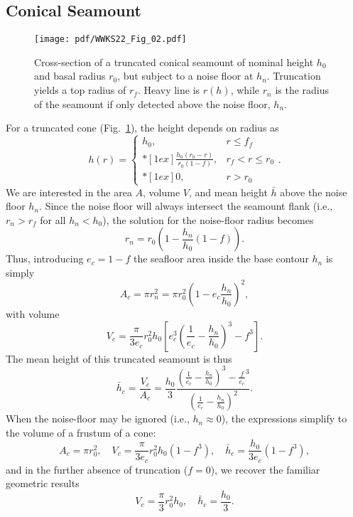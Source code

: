 \subsection{Conical Seamount}

\begin{figure}
\centering
\texttt{[image: pdf/WWKS22\_Fig\_02.pdf]}
\caption{Cross-section of a truncated conical seamount of nominal height $h_0$ and basal radius $r_0$, but subject
to a noise floor at $h_n$.  Truncation yields a top radius of $r_f$. Heavy line is $r(h)$, while $r_n$ is the
radius of the seamount if only detected above the noise floor, $h_n$.}
\label{WWKS22_Fig_02}
\end{figure}
For a truncated cone (Fig.~\ref{WWKS22_Fig_02}), the height depends on radius as
\begin{equation*}
h(r) = \left \{ \begin{array}{cl}
	h_0, &	r \leq f_f \\*[1ex]
	\displaystyle \frac{h_0 (r_0 - r)}{r_0 (1-f)}, & r_f < r \leq r_0 \\*[1ex]
	0, & r > r_0
\end{array} \right..
\end{equation*}
We are interested in the area $A$, volume $V$, and mean height $\bar{h}$ above the noise floor $h_n$.
Since the noise floor will always intersect the seamount flank (i.e., $r_n > r_f$ for all $h_n < h_0$),
the solution for the noise-floor radius becomes
\begin{equation*}
r_n = r_0 \left ( 1 - \frac{h_n}{h_0}(1 - f) \right ).
\end{equation*}
Thus, introducing $e_c = 1 -f$ the seafloor area inside the base contour $h_n$ is simply
\begin{equation}
A_c = \pi r_n^2 = \pi r_0^2 \left ( 1 - e_c\frac{h_n}{h_0} \right )^2,
\end{equation}
with volume
\begin{equation}
V_c = \frac{\pi}{3e_c}r_0^2h_0 \left [ e_c^3 \left (\frac{1}{e_c} - \frac{h_n}{h_0} \right )^3 - f^3 \right ].
\end{equation}
The mean height of this truncated seamount is thus
\begin{equation}
\bar{h}_c =  \frac{V_c}{A_c} = \frac{h_0}{3} \frac{\left (\frac{1}{e_c} - \frac{h_n}{h_0} \right )^3 - \frac{f}{e_c}^3}{\left (\frac{1}{e_c} - \frac{h_n}{h_0} \right)^2}.
\end{equation}
When the noise-floor may be ignored (i.e., $h_n \approx 0$), the expressions simplify to the volume of a frustum of a cone:
\begin{equation*}
A_c = \pi r_0^2,	\quad V_c = \frac{\pi}{3e_c}r_0^2h_0 \left (1 - f^3 \right ), \quad \bar{h}_c =  \frac{h_0}{3e_c}\left (1 - f^3 \right ),
\end{equation*}
and in the further absence of truncation ($f = 0$), we recover the familiar geometric results
\begin{equation*}
V_c = \frac{\pi}{3}r_0^2h_0, \quad \bar{h}_c =  \frac{h_0}{3}.
\end{equation*}

